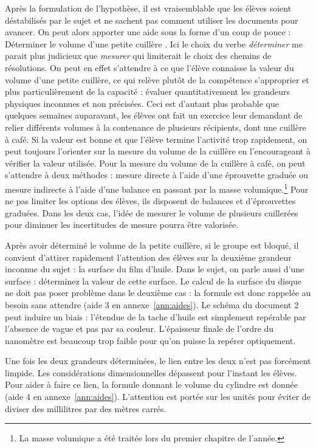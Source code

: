 \documentclass[12pt,a4paper]{article}
\begin{document}
Après la formulation de l'hypothèse, il est vraisemblable que les élèves soient déstabilisés par le sujet et ne sachent pas comment utiliser les documents pour avancer.
On peut alors apporter une aide sous la forme d'un coup de pouce : \og Déterminer le volume d'une petite cuillère \fg{}.
Ici le choix du verbe \emph{déterminer} me parait plus judicieux que \emph{mesurer} qui limiterait le choix des chemins de résolutions.
On peut en effet s'attendre à ce que l'élève connaisse la valeur du volume d'une petite cuillère, ce qui relève plutôt de la compétence s'approprier et plus particulièrement de la capacité : évaluer quantitativement les grandeurs physiques inconnues et non précisées.
Ceci est d'autant plus probable que quelques semaines auparavant, les élèves ont fait un exercice leur demandant de relier différents volumes à la contenance de plusieurs récipients, dont une cuillère à café.
Si la valeur est bonne et que l'élève termine l'activité trop rapidement, on peut toujours l'orienter sur la mesure du volume de la cuillère en l'encourageant à vérifier la valeur utilisée.
Pour la mesure du volume de la cuillère à café, on peut s'attendre à deux méthodes : mesure \og directe \fg{} à l'aide d'une éprouvette graduée ou mesure \og indirecte \fg{} à l'aide d'une balance en passant par la masse volumique.\footnote{La masse volumique a été traitée lors du premier chapitre de l'année.}
Pour ne pas limiter les options des élèves, ils disposent de balances et d'éprouvettes graduées.
Dans les deux cas, l'idée de mesurer le volume de plusieurs cuillerées pour diminuer les incertitudes de mesure pourra être valorisée.

Après avoir déterminé le volume de la petite cuillère, si le groupe est bloqué, il convient d'attirer rapidement l'attention des élèves sur la deuxième grandeur inconnue du sujet : la surface du film d'huile.
\og Dans le sujet, on parle aussi d'une surface : déterminez la valeur de cette surface.\fg{} 
Le calcul de la surface du disque ne doit pas poser problème dans le deuxième cas : la formule est donc rappelée au besoin sans attendre (aide 3 en annexe~\ref{ann:aides}).
Le schéma du document 2 peut induire un biais : l'étendue de la tache d'huile est simplement repérable par l'absence de vague et pas par sa couleur.
L'épaisseur finale de l'ordre du nanomètre est beaucoup trop faible pour qu'on puisse la repérer optiquement.

Une fois les deux grandeurs déterminées, le lien entre les deux n'est pas forcément limpide.
Les considérations dimensionnelles dépassent pour l'instant les élèves.
Pour aider à faire ce lien, la formule donnant le volume du cylindre est donnée (aide 4 en annexe~\ref{ann:aides}).
L'attention est portée sur les unités pour éviter de diviser des millilitres par des mètres carrés.
\end{document}
